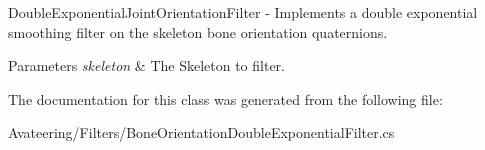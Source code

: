 Double\+Exponential\+Joint\+Orientation\+Filter -\/ Implements a double exponential smoothing filter on the skeleton bone orientation quaternions. 


\begin{DoxyParams}{Parameters}
{\em skeleton} & The Skeleton to filter.\\
\hline
\end{DoxyParams}


The documentation for this class was generated from the following file\+:\begin{DoxyCompactItemize}
\item 
Avateering/\+Filters/Bone\+Orientation\+Double\+Exponential\+Filter.\+cs\end{DoxyCompactItemize}
